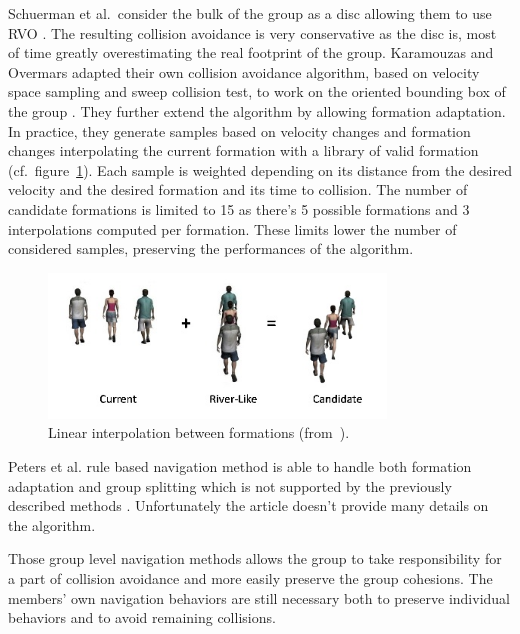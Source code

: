 \documentclass[a4paper,titlepage]{article}
\begin{document}
Schuerman et al.\ consider the bulk of the group as a disc allowing them to use RVO \cite{Schuerman:2010um,vandenBerg:2008tu}. The resulting collision avoidance is very conservative as the disc is, most of time greatly overestimating the real footprint of the group. Karamouzas and Overmars adapted their own collision avoidance algorithm, based on velocity space sampling and sweep collision test, to work on the oriented bounding box of the group \cite{ko_vriphys10,Karamouzas:2010fi}. They further extend the algorithm by allowing formation adaptation. In practice, they generate samples based on velocity changes and formation changes interpolating the current formation with a library of valid formation (cf.\ figure~\ref{fig:formations_linear_interpolation}). Each sample is weighted depending on its distance from the desired velocity and the desired formation and its time to collision. The number of candidate formations is limited to 15 as there’s 5 possible formations and 3 interpolations computed per formation. These limits lower the number of considered samples, preserving the performances of the algorithm. 

\begin{figure}[h]
\centering
\includegraphics[width=0.8\textwidth]{FormationsLinearInterpolation.jpg}
\caption{Linear interpolation between formations (from~\cite{Karamouzas:2010fi}).}
\label{fig:formations_linear_interpolation}
\end{figure} 

Peters et al. rule based navigation method is able to handle both formation adaptation and group splitting which is not supported by the previously described methods \cite{Peters:2009kx}. Unfortunately the article doesn’t provide many details on the algorithm.

Those group level navigation methods allows the group to take responsibility for a part of collision avoidance and more easily preserve the group cohesions. The members’ own navigation behaviors are still necessary both to preserve individual behaviors and to avoid remaining collisions. 
\end{document}
